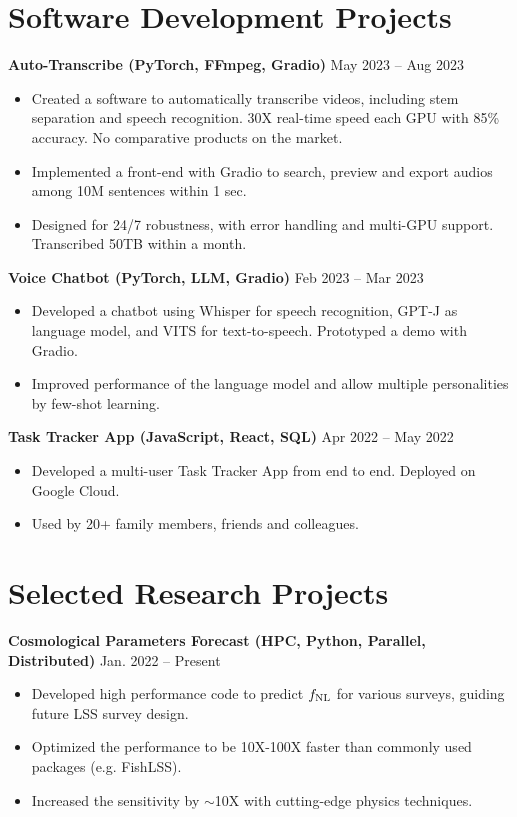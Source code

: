 \documentclass[letterpaper,12pt]{article}
\newenvironment{zitemize}{
\begin{itemize} \vspace{-.8em}\itemsep 0pt \parskip 0pt}
{\end{itemize}\vspace{-.7em}}
\newcommand{\proglang}[1]{#1}
\begin{document}
\section{Software Development Projects}
\textbf{Auto-Transcribe (PyTorch, FFmpeg, Gradio)} \hfill May 2023 -- Aug 2023 \\
\begin{zitemize}
    \item Created a software to automatically transcribe videos, including stem separation and speech recognition. 30X real-time speed each GPU with 85\% accuracy. No comparative products on the market.
    \item Implemented a front-end with \proglang{Gradio} to search, preview and export audios among 10M sentences within 1 sec.
    \item Designed for 24/7 robustness, with error handling and multi-GPU support. Transcribed 50TB within a month.
\end{zitemize}

\textbf{Voice Chatbot (PyTorch, LLM, Gradio)} \hfill Feb 2023 -- Mar 2023 \\
\begin{zitemize}
    \item Developed a chatbot using \proglang{Whisper} for speech recognition, \proglang{GPT-J} as language model, and \proglang{VITS} for text-to-speech. Prototyped a demo with \proglang{Gradio}.
    \item Improved performance of the language model and allow multiple personalities by few-shot learning.
\end{zitemize}

\textbf{Task Tracker App (JavaScript, React, SQL)} \hfill Apr 2022 -- May 2022 \\
\begin{zitemize}
    \item Developed a multi-user Task Tracker App from end to end. Deployed on \proglang{Google Cloud}.
    \item Used by 20+ family members, friends and colleagues.
\end{zitemize}


\section{Selected Research Projects}
\textbf{Cosmological Parameters Forecast (HPC, Python, Parallel, Distributed)} \hfill Jan. 2022 -- Present \\
\begin{zitemize}
    \item Developed high performance code to predict $f_{\rm NL}$ for various surveys, guiding future LSS survey design.
    \item Optimized the performance to be 10X-100X faster than commonly used packages (e.g. FishLSS).
    \item Increased the sensitivity by $\sim$10X with cutting-edge physics techniques.
\end{zitemize}
\end{document}
